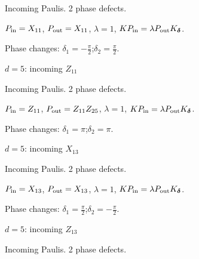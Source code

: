 Incoming Paulis. 2 phase defects.
\begin{center}
\end{center}
\vspace{-1mm}
$P_{\rm in}=X_{11}$, \quad $P_{\rm out}=X_{11}$, \quad $\lambda=1$, \qquad $K P_{\rm in}=\lambda P_{\rm out}K_{\boldsymbol\delta}$.
\par\smallskip\begin{minipage}{.98\linewidth}\small Phase changes: $\delta_{1}=-\frac{\pi}{2}$;\quad $\delta_{2}=\frac{\pi}{2}$.\end{minipage}
\vfill
{\footnotesize\texttt{}}
\newpage
{}
{\Large $d=5$: incoming $Z_{11}$}\par
Incoming Paulis. 2 phase defects.
\begin{center}
\end{center}
\vspace{-1mm}
$P_{\rm in}=Z_{11}$, \quad $P_{\rm out}=Z_{11}Z_{25}$, \quad $\lambda=1$, \qquad $K P_{\rm in}=\lambda P_{\rm out}K_{\boldsymbol\delta}$.
\par\smallskip\begin{minipage}{.98\linewidth}\small Phase changes: $\delta_{1}=\pi$;\quad $\delta_{2}=\pi$.\end{minipage}
\vfill
{\footnotesize\texttt{}}
\newpage
{}
{\Large $d=5$: incoming $X_{13}$}\par
Incoming Paulis. 2 phase defects.
\begin{center}
\end{center}
\vspace{-1mm}
$P_{\rm in}=X_{13}$, \quad $P_{\rm out}=X_{13}$, \quad $\lambda=1$, \qquad $K P_{\rm in}=\lambda P_{\rm out}K_{\boldsymbol\delta}$.
\par\smallskip\begin{minipage}{.98\linewidth}\small Phase changes: $\delta_{1}=\frac{\pi}{2}$;\quad $\delta_{2}=-\frac{\pi}{2}$.\end{minipage}
\vfill
{\footnotesize\texttt{}}
\newpage
{}
{\Large $d=5$: incoming $Z_{13}$}\par
Incoming Paulis. 2 phase defects.
\begin{center}
\end{center}

